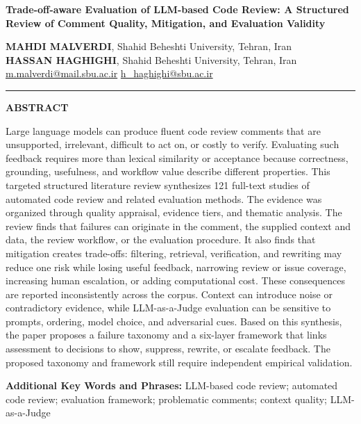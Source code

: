 \documentclass[10pt]{article}
\renewenvironment{abstract}{%
  \vspace{0.7em}\noindent\rule{\linewidth}{0.5pt}\par
  \vspace{0.55em}\noindent\textbf{ABSTRACT}\par\small\noindent
}{\par\normalsize\vspace{0.35em}}
\newcommand{\keywords}[1]{%
  \vspace{0.45em}
  \noindent\textbf{Additional Key Words and Phrases: }#1
}
\begin{document}
\thispagestyle{plain}
\begin{flushleft}
{\LARGE\bfseries Trade-off-aware Evaluation of LLM-based Code Review: A Structured Review of Comment Quality, Mitigation, and Evaluation Validity\par}
\vspace{1.25em}
{\large\bfseries MAHDI MALVERDI}, Shahid Beheshti University, Tehran, Iran\\
{\large\bfseries HASSAN HAGHIGHI}, Shahid Beheshti University, Tehran, Iran\\
\vspace{0.35em}
{\small \href{mailto:m.malverdi@mail.sbu.ac.ir}{m.malverdi@mail.sbu.ac.ir} \quad
\href{mailto:h_haghighi@sbu.ac.ir}{h\_haghighi@sbu.ac.ir}}
\end{flushleft}


\begin{abstract}
Large language models can produce fluent code review comments that are unsupported, irrelevant, difficult to act on, or costly to verify. Evaluating such feedback requires more than lexical similarity or acceptance because correctness, grounding, usefulness, and workflow value describe different properties. This targeted structured literature review synthesizes 121 full-text studies of automated code review and related evaluation methods. The evidence was organized through quality appraisal, evidence tiers, and thematic analysis. The review finds that failures can originate in the comment, the supplied context and data, the review workflow, or the evaluation procedure. It also finds that mitigation creates trade-offs: filtering, retrieval, verification, and rewriting may reduce one risk while losing useful feedback, narrowing review or issue coverage, increasing human escalation, or adding computational cost. These consequences are reported inconsistently across the corpus. Context can introduce noise or contradictory evidence, while LLM-as-a-Judge evaluation can be sensitive to prompts, ordering, model choice, and adversarial cues. Based on this synthesis, the paper proposes a failure taxonomy and a six-layer framework that links assessment to decisions to show, suppress, rewrite, or escalate feedback. The proposed taxonomy and framework still require independent empirical validation.
\end{abstract}
\keywords{LLM-based code review; automated code review; evaluation framework; problematic comments; context quality; LLM-as-a-Judge}
\end{document}
